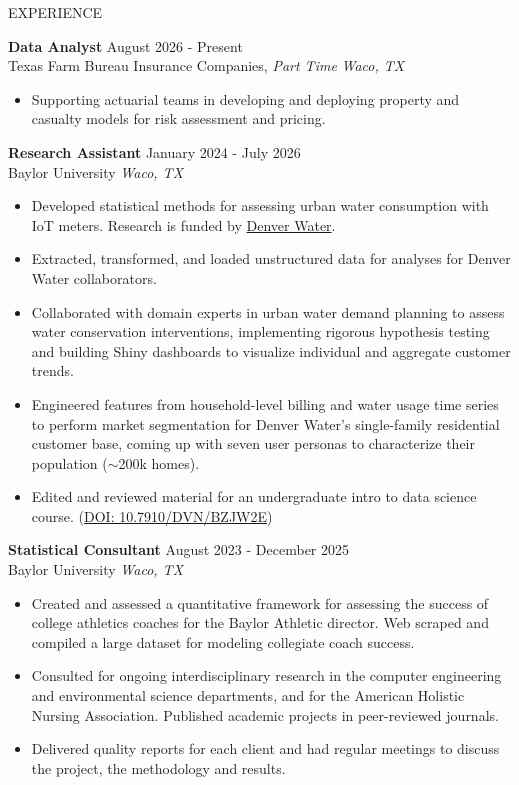 \documentclass{resume} %
\begin{document}
\begin{rSection}{EXPERIENCE}

\textbf{Data Analyst} \hfill August 2026 - Present\\
Texas Farm Bureau Insurance Companies, \textit{Part Time} \hfill \textit{Waco, TX}
 \begin{itemize}
    \itemsep -3pt {}
     \item Supporting actuarial teams in developing and deploying property and casualty models for risk assessment and pricing.
 \end{itemize}

\textbf{Research Assistant} \hfill January 2024 - July 2026\\
Baylor University \hfill \textit{Waco, TX}
 \begin{itemize}
    \itemsep -3pt {}
     \item Developed statistical methods for assessing urban water consumption with IoT meters. Research is funded by \href{https://www.denverwater.org}{Denver Water}.
     \item Extracted, transformed, and loaded unstructured data for analyses for Denver Water collaborators.
     \item Collaborated with domain experts in urban water demand planning to assess water conservation interventions, implementing rigorous hypothesis testing and building Shiny dashboards to visualize individual and aggregate customer trends.
     \item Engineered features from household-level billing and water usage time series to perform market segmentation for Denver Water's single-family residential customer base, coming up with seven user personas to characterize their population ($\sim$200k homes).
     \item Edited and reviewed material for an undergraduate intro to data science course. (\href{https://doi.org/10.7910/DVN/BZJW2E}{DOI: 10.7910/DVN/BZJW2E})
 \end{itemize}

\textbf{Statistical Consultant} \hfill August 2023 - December 2025\\
Baylor University \hfill \textit{Waco, TX}
 \begin{itemize}
    \itemsep -3pt {}
     \item Created and assessed a quantitative framework for assessing the success of college athletics coaches for the Baylor Athletic director. Web scraped and compiled a large dataset for modeling collegiate coach success.
     \item Consulted for ongoing interdisciplinary research in the computer engineering and environmental science departments, and for the American Holistic Nursing Association.  Published academic projects in peer-reviewed journals.
     \item Delivered quality reports for each client and had regular meetings to discuss the project, the methodology and results.
 \end{itemize}


\end{rSection}
\end{document}
